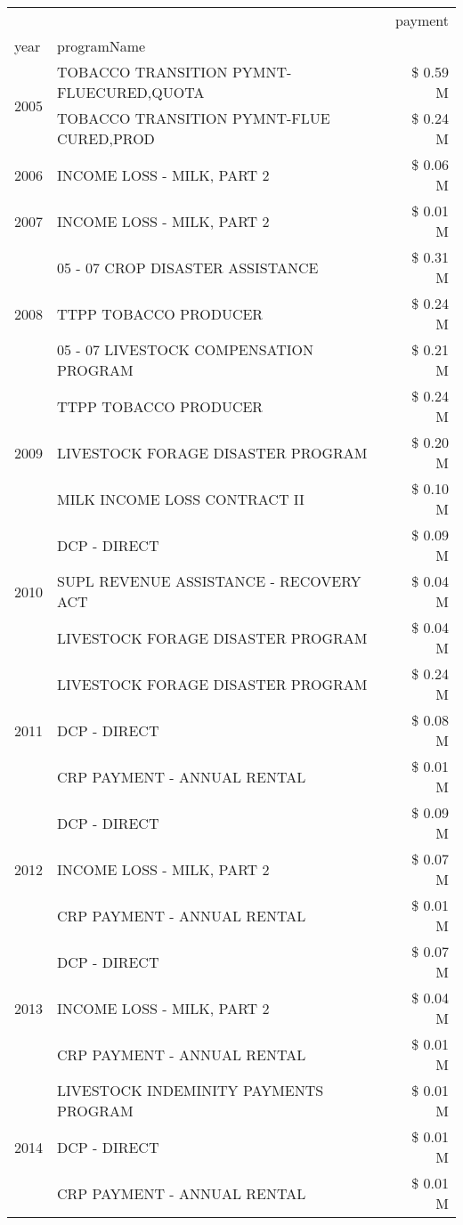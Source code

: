 \begin{tabular}{llr}
\toprule
 &  & payment \\
year & programName &  \\
\midrule
\multirow[t]{2}{*}{2005} & TOBACCO TRANSITION PYMNT-FLUECURED,QUOTA & \$ 0.59 M \\
 & TOBACCO TRANSITION PYMNT-FLUE CURED,PROD & \$ 0.24 M \\
\cline{1-3}
2006 & INCOME LOSS - MILK, PART 2 & \$ 0.06 M \\
\cline{1-3}
2007 & INCOME LOSS - MILK, PART 2 & \$ 0.01 M \\
\cline{1-3}
\multirow[t]{3}{*}{2008} & 05 - 07 CROP DISASTER ASSISTANCE & \$ 0.31 M \\
 & TTPP TOBACCO PRODUCER & \$ 0.24 M \\
 & 05 - 07 LIVESTOCK COMPENSATION PROGRAM & \$ 0.21 M \\
\cline{1-3}
\multirow[t]{3}{*}{2009} & TTPP TOBACCO PRODUCER & \$ 0.24 M \\
 & LIVESTOCK FORAGE DISASTER  PROGRAM & \$ 0.20 M \\
 & MILK INCOME LOSS CONTRACT II & \$ 0.10 M \\
\cline{1-3}
\multirow[t]{3}{*}{2010} & DCP - DIRECT & \$ 0.09 M \\
 & SUPL REVENUE ASSISTANCE - RECOVERY ACT & \$ 0.04 M \\
 & LIVESTOCK FORAGE DISASTER PROGRAM & \$ 0.04 M \\
\cline{1-3}
\multirow[t]{3}{*}{2011} & LIVESTOCK FORAGE DISASTER PROGRAM & \$ 0.24 M \\
 & DCP - DIRECT & \$ 0.08 M \\
 & CRP PAYMENT - ANNUAL RENTAL & \$ 0.01 M \\
\cline{1-3}
\multirow[t]{3}{*}{2012} & DCP - DIRECT & \$ 0.09 M \\
 & INCOME LOSS - MILK, PART 2 & \$ 0.07 M \\
 & CRP PAYMENT - ANNUAL RENTAL & \$ 0.01 M \\
\cline{1-3}
\multirow[t]{3}{*}{2013} & DCP - DIRECT & \$ 0.07 M \\
 & INCOME LOSS - MILK, PART 2 & \$ 0.04 M \\
 & CRP PAYMENT - ANNUAL RENTAL & \$ 0.01 M \\
\cline{1-3}
\multirow[t]{3}{*}{2014} & LIVESTOCK INDEMINITY PAYMENTS PROGRAM & \$ 0.01 M \\
 & DCP - DIRECT & \$ 0.01 M \\
 & CRP PAYMENT - ANNUAL RENTAL & \$ 0.01 M \\

\end{tabular}
